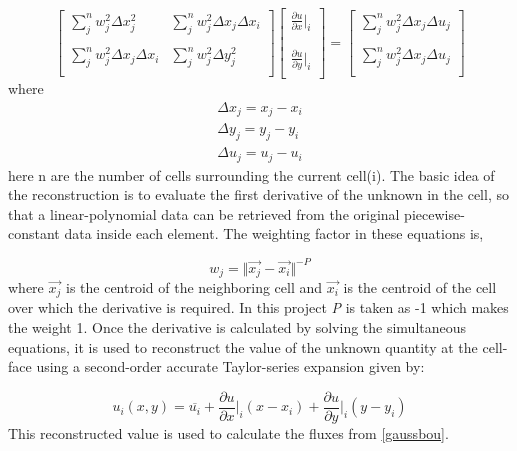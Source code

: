 \documentclass[12pt]{elsarticle}
\begin{document}
	$$
	\begin{bmatrix}
		\sum\limits_{j}^{n} w_j^2 \Delta x_j^2 & \sum\limits_{j}^{n} w_j^2 \Delta x_j \Delta x_i\\
		\\
		\sum\limits_{j}^{n} w_j^2 \Delta x_j \Delta x_i & \sum\limits_{j}^{n} w_j^2 \Delta y_j^2\\
	\end{bmatrix}
	\begin{bmatrix}
		\frac{\partial u}{\partial x}|_i\\
		\\
		\\
		\frac{\partial u}{\partial y}|_i\\
	\end{bmatrix}
	=
	\begin{bmatrix}
		\sum\limits_{j}^{n} w_j^2\Delta x_j \Delta u_j\\
		\\
		\sum\limits_{j}^{n} w_j^2\Delta x_j\Delta u_j\\
	\end{bmatrix}
	$$
	where
	\begin{equation}
		\begin{gathered}
			\Delta x_j=x_j-x_i\\
			\Delta y_j=y_j-y_i\\
			\Delta u_j=u_j-u_i
		\end{gathered}
	\end{equation}
	here n are the number of cells surrounding the current cell(i). The basic idea of the reconstruction is to evaluate the first derivative of the unknown in the cell, so that a linear-polynomial data can be retrieved from the original piecewise-constant data inside each element. The weighting factor in these equations is,
	
	\begin{equation}
		w_j = \Vert \overrightarrow{x_j} - \overrightarrow{x_i} \Vert ^{-P}
	\end{equation}
	where $\overrightarrow{x_j}$ is the centroid of the neighboring cell and $\overrightarrow{x_i}$ is the centroid of the cell over which the derivative is required. In this project \textit{P} is taken as -1 which makes the weight 1. Once the derivative is calculated by solving the simultaneous equations, it is used to reconstruct the value of the unknown quantity at the cell-face using a second-order accurate Taylor-series expansion given by:
	
	\begin{equation}
		u_i(x,y)=\overline{u_i}+\frac{\partial u}{\partial x}\Big|_i (x-x_i)+\frac{\partial u}{\partial y}\Big|_i(y-y_i)
	\end{equation}
	This reconstructed value is used to calculate the fluxes from \ref{gaussbou}.
	
\end{document}
